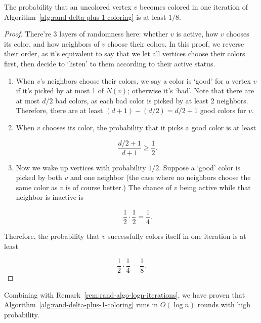 \begin{theorem}
	The probability that an uncolored vertex $v$ becomes colored in one iteration of Algorithm~\ref{alg:rand-delta-plus-1-coloring} is at least $1/8$.
\end{theorem}
\begin{proof}
	There're 3 layers of randomness here: whether $v$ is active, how $v$ chooses its color, and how neighbors of $v$ choose their colors. In this proof, we reverse their order, as it's equivalent to say that we let all vertices choose their colors first, then decide to `listen' to them according to their active status.

	\begin{enumerate}
		\item When $v$'s neighbors choose their colors, we say a color is `good' for a vertex $v$ if it's picked by at most 1 of $N(v)$; otherwise it's `bad'. Note that there are at most $d/2$ bad colors, as each bad color is picked by at least 2 neighbors. Therefore, there are at least $(d+1) - (d/2) = d/2 + 1$ good colors for $v$.
		\item When $v$ chooses its color, the probability that it picks a good color is at least

		      \[
			      \frac{d/2 + 1}{d + 1} \geq \frac{1}{2}.
		      \]
		\item Now we wake up vertices with probability $1/2$.
		      Suppose a `good' color is picked by both $v$ and one neighbor (the case where no neighbors choose the same color as $v$ is of course better.) The chance of $v$ being active while that neighbor is inactive is

		      \[
			      \frac{1}{2} \cdot \frac{1}{2} = \frac{1}{4}.
		      \]
	\end{enumerate}

	Therefore, the probability that $v$ successfully colors itself in one iteration is at least

	\[
		\frac{1}{2} \cdot \frac{1}{4} = \frac{1}{8}.
	\]
\end{proof}

Combining with Remark~\ref{rem:rand-algo-logn-iterations}, we have proven that Algorithm~\ref{alg:rand-delta-plus-1-coloring} runs in $O(\log n)$ rounds with high probability.
